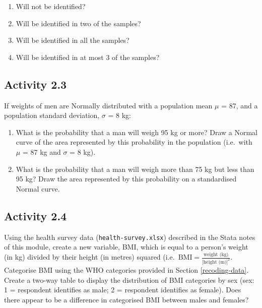 \documentclass[
]{memoir}
\providecommand{\tightlist}{%
  \setlength{\itemsep}{0pt}\setlength{\parskip}{0pt}}
\begin{document}
\begin{enumerate}
\def\labelenumi{\alph{enumi})}
\tightlist
\item
  Will not be identified?
\item
  Will be identified in two of the samples?
\item
  Will be identified in all the samples?
\item
  Will be identified in at most 3 of the samples?
\end{enumerate}

\hypertarget{activity-2.3}{%
\subsection*{Activity 2.3}\label{activity-2.3}}

If weights of men are Normally distributed with a population mean \(\mu\) = 87, and a population standard deviation, \(\sigma\) = 8 kg:

\begin{enumerate}
\def\labelenumi{\alph{enumi})}
\tightlist
\item
  What is the probability that a man will weigh 95 kg or more? Draw a Normal curve of the area represented by this probability in the population (i.e.~with \(\mu\) = 87 kg and \(\sigma\) = 8 kg).
\item
  What is the probability that a man will weigh more than 75 kg but less than 95 kg? Draw the area represented by this probability on a standardised Normal curve.
\end{enumerate}

\hypertarget{activity-2.4}{%
\subsection*{Activity 2.4}\label{activity-2.4}}

Using the health survey data (\texttt{health-survey.xlsx}) described in the Stata notes of this module, create a new variable, BMI, which is equal to a person's weight (in kg) divided by their height (in metres) squared (i.e.~\(\text{BMI} = \frac{\text{weight (kg)}}{\text{[height (m)]}^2}\). Categorise BMI using the WHO categories provided in Section \ref{recoding-data}. Create a two-way table to display the distribution of BMI categories by sex (sex: 1 = respondent identifies as male; 2 = respondent identifies as female). Does there appear to be a difference in categorised BMI between males and females?
\end{document}
